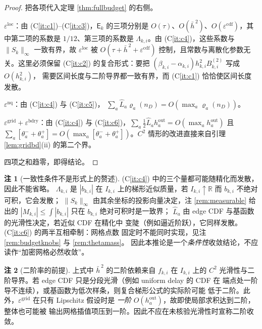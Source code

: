 \documentclass[a4paper,11pt]{article}
\theoremstyle{definition}
\newtheorem{remark}{注}
\newcommand{\R}{\mathbb R}
\newcommand{\1}{\mathbf 1}
\newcommand{\Eerr}{\mathsf E}
\newcommand{\ecdf}{\varepsilon^{\mathrm{cdf}}}
\begin{document}
\begin{proof}
把各项代入定理 \ref{thm:fullbudget} 的右侧。

$\varepsilon^{\mathrm{loc}}$：由 (C\ref{it:c1})--(C\ref{it:c3})，$\Eerr_k$
的三项分别是 $O(\tau)$、$O(\bar h^{\,2})$、$O(\ecdf)$，其中第二项的系数是
$1/12$、第三项的系数是 $\Lambda_{k,i}$。由 (C\ref{it:c4})，这些系数与
$\|S_k\|_\infty$ 一致有界，故 $\varepsilon^{\mathrm{loc}}$ 被
$O(\tau+\bar h^{\,2}+\ecdf)$ 控制，且常数与离散化参数无关。这里必须保留
(C\ref{it:c2}) 的复合形式：要把
$(\beta_{k,i}-\alpha_{k,i})h_{k,i}^2B_{k,i}^{(2)}$ 写成 $O(h_{k,i}^2)$，
需要区间长度与二阶导界都一致有界，而 (C\ref{it:c1}) 恰恰使区间长度发散。

$\varepsilon^{\mathrm{nq}}$：由 (C\ref{it:c4}) 与 (C\ref{it:c5})，
$\sum_a\widehat L_a\varrho_a(n_D)=O(\max_a\varrho_a(n_D))$。

$\varepsilon^{\mathrm{grid}}+\varepsilon^{\mathrm{bdry}}$：由 (C\ref{it:c4})
与 (C\ref{it:c6})，$\sum_a\tfrac12\widehat L_ah_a^{\mathrm{out}}
=O(\max_ah_a^{\mathrm{out}})$ 且
$\sum_a[\theta_a^-+\theta_a^+]=O(\max_a[\theta_a^-+\theta_a^+])$。$C^2$
情形的改进直接来自引理 \ref{lem:gridbd}(ii) 的第二个界。

四项之和趋零，即得结论。
\end{proof}

\begin{remark}[一致性条件不是形式上的赘述]
\label{rem:uniformity}
(C\ref{it:c4}) 中的三个量都可能随精化而发散，因此不能省略。
$\Lambda_{k,i}$ 是 $|b_{k,i}|$ 在 $I_{k,i}$ 上的梯形近似质量，若
$I_{k,i}\uparrow\R$ 而 $b_{k,i}$ 不绝对可积，它会发散；
$\|S_k\|_\infty$ 由其余坐标的投影向量决定，注 \ref{rem:measurable} 给出的
$|M_{k,i}|\le\int|b_{k,i}|$ 只在 $b_{k,i}$ 绝对可积时是一致界；
$\widehat L_a$ 由 edge CDF 与基函数的光滑性决定，若近似 CDF 在精化中
变陡（例如逼近阶跃），它同样发散。(C\ref{it:c6}) 的两半互相牵制：网格点数
固定时不能同时实现，见注 \ref{rem:budgetknobs} 与 \ref{rem:thetamass}。
因此本推论是一个\emph{条件性}收敛结论，不应读作“加密网格必然收敛”。
\end{remark}

\begin{remark}[二阶率的前提]
\label{rem:secondorder}
上式中 $\bar h^{\,2}$ 的二阶依赖来自 $f_{k,i}$ 在 $I_{k,i}$ 上的 $C^2$
光滑性与二阶导界。若 edge CDF 只是分段光滑（例如 uniform delay 的 CDF 在
端点处一阶导不连续），或基函数为低次样条，则复合梯形公式的实际阶可能
低于二阶。此外，$\varepsilon^{\mathrm{grid}}$ 在只有 Lipschitz 假设时是
\emph{一阶} $O(h_a^{\mathrm{out}})$，故即使局部求积达到二阶，整体也可能被
输出网格插值项压到一阶。因此不应在未核验光滑性时宣称二阶收敛。
\end{remark}
\end{document}
